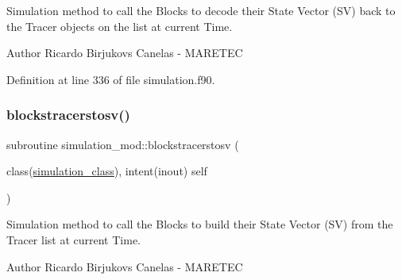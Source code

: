 Simulation method to call the Blocks to decode their State Vector (SV) back to the Tracer objects on the list at current Time. 

\begin{DoxyAuthor}{Author}
Ricardo Birjukovs Canelas -\/ M\+A\+R\+E\+T\+EC 
\end{DoxyAuthor}


Definition at line 336 of file simulation.\+f90.


\mbox{\label{namespacesimulation__mod_a2fbc294996a615647983ec637b83cfc0}} 
\subsubsection{\texorpdfstring{blockstracerstosv()}{blockstracerstosv()}}
{\footnotesize\ttfamily subroutine simulation\+\_\+mod\+::blockstracerstosv (\begin{DoxyParamCaption}\item[{class(\mbox{\hyperlink{structsimulation__mod_1_1simulation__class}{simulation\+\_\+class}}), intent(inout)}]{self }\end{DoxyParamCaption})\hspace{0.3cm}{\ttfamily [private]}}



Simulation method to call the Blocks to build their State Vector (SV) from the Tracer list at current Time. 

\begin{DoxyAuthor}{Author}
Ricardo Birjukovs Canelas -\/ M\+A\+R\+E\+T\+EC 
\end{DoxyAuthor}


